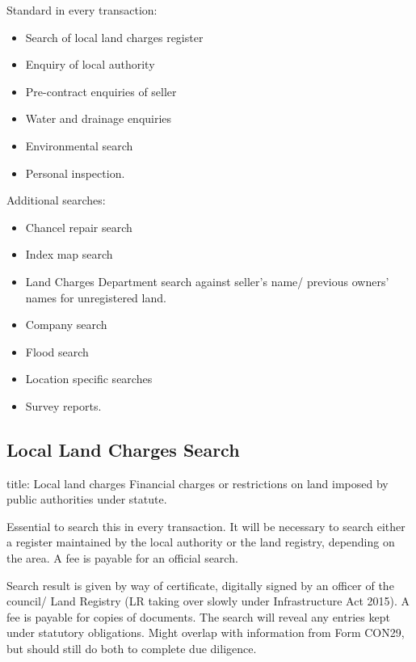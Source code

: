 \documentclass[
]{article}
\newenvironment{Shaded}{}{}
\newcommand{\NormalTok}[1]{#1}
\providecommand{\tightlist}{%
  \setlength{\itemsep}{0pt}\setlength{\parskip}{0pt}}
\begin{document}
Standard in every transaction:

\begin{itemize}
\tightlist
\item
  Search of local land charges register
\item
  Enquiry of local authority
\item
  Pre-contract enquiries of seller
\item
  Water and drainage enquiries
\item
  Environmental search
\item
  Personal inspection.
\end{itemize}

Additional searches:

\begin{itemize}
\tightlist
\item
  Chancel repair search
\item
  Index map search
\item
  Land Charges Department search against seller's name/ previous owners'
  names for unregistered land.
\item
  Company search
\item
  Flood search
\item
  Location specific searches
\item
  Survey reports.
\end{itemize}

\hypertarget{local-land-charges-search}{%
\subsection{Local Land Charges Search}\label{local-land-charges-search}}

\begin{Shaded}
\begin{Highlighting}[]
\NormalTok{title: Local land charges}
\NormalTok{Financial charges or restrictions on land imposed by public authorities under statute. }
\end{Highlighting}
\end{Shaded}

Essential to search this in every transaction. It will be necessary to
search either a register maintained by the local authority or the land
registry, depending on the area. A fee is payable for an official
search.

Search result is given by way of certificate, digitally signed by an
officer of the council/ Land Registry (LR taking over slowly under
Infrastructure Act 2015). A fee is payable for copies of documents. The
search will reveal any entries kept under statutory obligations. Might
overlap with information from Form CON29, but should still do both to
complete due diligence.
\end{document}
